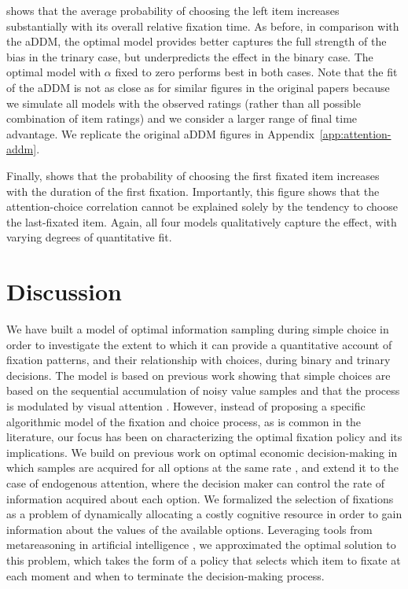  shows that the average probability of choosing the left item increases substantially with its overall relative fixation time. As before, in comparison with the aDDM, the optimal model provides better captures the full strength of the bias in the trinary case, but underpredicts the effect in the binary case. The optimal model with $\alpha$ fixed to zero performs best in both cases. Note that the fit of the aDDM is not as close as for similar figures in the original papers because we simulate all models with the observed ratings (rather than all possible combination of item ratings) and we consider a larger range of final time advantage. We replicate the original aDDM figures in Appendix~\ref{app:attention-addm}. 

Finally,  shows that the probability of choosing the first fixated item increases with the duration of the first fixation. Importantly, this figure shows that the attention-choice correlation cannot be explained solely by the tendency to choose the last-fixated item. Again, all four models qualitatively capture the effect, with varying degrees of quantitative fit.
 

\section{Discussion}

We have built a model of optimal information sampling during simple choice in order to investigate the extent to which it can provide a quantitative account of fixation patterns, and their relationship with choices, during binary and trinary decisions. The model is based on previous work showing that simple choices are based on the sequential accumulation of noisy value samples \citep{ratcliff1978theory,tajima2016optimal,ratcliff2008diffusion,teodorescu2013disentangling,busemeyer1993decision,holmes2016new} and that the process is modulated by visual attention \citep{krajbich2010visual,krajbich2011multialternative,gluth2018valuebaseda,gluth2020valuebased,song2019proactive,smith2018attention,armel2008biasing}. However, instead of proposing a specific algorithmic model of the fixation and choice process, as is common in the literature, our focus has been on characterizing the optimal fixation policy and its implications. We build on previous work on optimal economic decision-making in which samples are acquired for all options at the same rate \citep{tajima2016optimal,fudenberg2018speed,bogacz2006physics,tajima2019optimal}, and extend it to the case of endogenous attention, where the decision maker can control the rate of information acquired about each option. We formalized the selection of fixations as a problem of dynamically allocating a costly cognitive resource in order to gain information about the values of the available options. Leveraging tools from metareasoning in artificial intelligence \citep{matheson1968economic,russell1991principles,hay2012selecting,callaway2018learning}, we approximated the optimal solution to this problem, which takes the form of a policy that selects which item to fixate at each moment and when to terminate the decision-making process.

